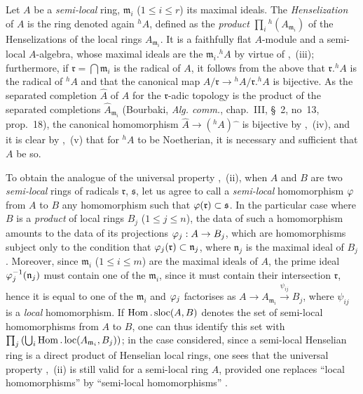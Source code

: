 \begin{env}[18.6.7]
\label{IV.18.6.7}
Let $A$ be a \emph{semi-local} ring, $\mathfrak{m}_i$ ($1\leq i\leq r$) its maximal ideals.
The \emph{Henselization} of $A$ is the ring denoted again ${}^h\!A$, defined as the \emph{product} $\prod_i{}^h(A_{\mathfrak{m}_i})$ of the Henselizations of the local rings $A_{\mathfrak{m}_i}$.
It is a faithfully flat $A$-module and a semi-local $A$-algebra, whose maximal ideals are the $\mathfrak{m}_i.{}^h\!A$ by virtue of ,~(iii);
furthermore, if $\mathfrak{r}=\bigcap\mathfrak{m}_i$ is the radical of $A$, it follows from the above that $\mathfrak{r}.{}^h\!A$
is the radical of ${}^h\!A$ and that the canonical map $A/\mathfrak{r}\to{}^h\!A/\mathfrak{r}.{}^h\!A$ is bijective.
As the separated completion $\hat{A}$ of $A$ for the $\mathfrak{r}$-adic topology is the product of the separated completions $\hat{A}_{\mathfrak{m}_i}$ (Bourbaki, \emph{Alg. comm.}, chap.~III, \S~2, no~13, prop.~18), the canonical homomorphism $\hat{A}\to({}^h\!A)\hat{\phantom{x}}$ is bijective by ,~(iv), and it is clear by ,~(v) that for ${}^h\!A$ to be Noetherian, it is necessary and sufficient that $A$ be so.

To obtain the analogue of the universal property ,~(ii), when $A$ and $B$ are two \emph{semi-local} rings of radicals $\mathfrak{r}$, $\mathfrak{s}$, let us agree to call a \emph{semi-local} homomorphism $\varphi$ from $A$ to $B$ any homomorphism such that $\varphi(\mathfrak{r})\subset\mathfrak{s}$.
In the particular case where $B$ is a \emph{product} of local rings $B_j$ ($1\leq j\leq n$), the data of such a homomorphism amounts to the data of its projections $\varphi_j:A\to B_j$, which are homomorphisms subject only to the condition that $\varphi_j(\mathfrak{r})\subset\mathfrak{n}_j$, where $\mathfrak{n}_j$ is the maximal ideal of $B_j$.
Moreover, since $\mathfrak{m}_i$ ($1\leq i\leq m$) are the maximal ideals of $A$, the prime ideal $\varphi_j^{-1}(\mathfrak{n}_j)$ must contain one of the $\mathfrak{m}_i$, since it must contain their intersection $\mathfrak{r}$, hence it is equal to one of the $\mathfrak{m}_i$ and $\varphi_j$ factorises as $A\to A_{\mathfrak{m}_i}\xrightarrow{\psi_{ij}}B_j$, where $\psi_{ij}$ is a \emph{local} homomorphism.
If $\operatorname{Hom}.\operatorname{sloc}(A,B)$ denotes the set of semi-local homomorphisms from $A$ to $B$, one can thus identify this set with $\prod_j\left(\bigcup_i\operatorname{Hom}.\operatorname{loc}(A_{\mathfrak{m}_i},B_j)\right)$;
in the case considered, since a semi-local Henselian ring is a direct product of Henselian local rings, one sees that the universal property ,~(ii) is still valid for a semi-local ring $A$, provided one replaces ``local homomorphisms'' by ``semi-local homomorphisms'' .
\end{env}

